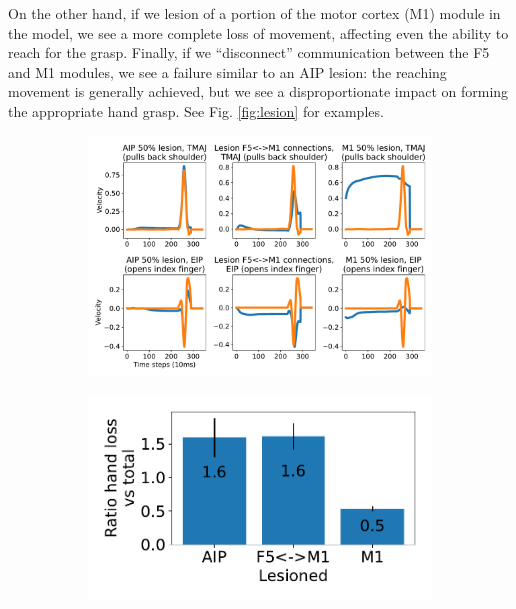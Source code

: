 \documentclass[12pt]{iopart}
\begin{document}
On the other hand, if we lesion of a portion of the motor cortex (M1) module in the model,
we see a more complete loss of movement, affecting even the ability to reach for the grasp.
Finally, if we ``disconnect'' communication between the F5 and M1 modules, we see a
failure similar to an AIP lesion: the reaching movement is generally achieved, but we see
a disproportionate impact on forming the appropriate hand grasp. See Fig. \ref{fig:lesion}
for examples.

\begin{figure}[h]
	\centering
	\begin{subfigure}[c]{0.62\textwidth}
	    \centering
	    \includegraphics[width=\textwidth]{lesion_trajs.pdf}
	    \caption{}
	\end{subfigure}
	\hfill
	\begin{subfigure}[c]{0.32\textwidth}
	    \centering
	    \includegraphics[width=\textwidth]{lesion_hand.pdf}
	    \caption{}

\end{subfigure}
\end{figure}
\end{document}
